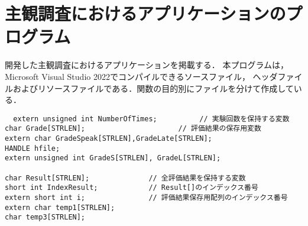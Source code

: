\chapter{主観調査におけるアプリケーションのプログラム}
開発した主観調査におけるアプリケーションを掲載する．
本プログラムは，Microsoft Visual Studio 2022でコンパイルできるソースファイル，
ヘッダファイルおよびリソースファイルである．関数の目的別にファイルを分けて作成している．

\begin{verbatim}
  extern unsigned int NumberOfTimes;          // 実験回数を保持する変数
char Grade[STRLEN];                      // 評価結果の保存用変数
extern char GradeSpeak[STRLEN],GradeLate[STRLEN];
HANDLE hfile;
extern unsigned int GradeS[STRLEN], GradeL[STRLEN];

char Result[STRLEN];              // 全評価結果を保持する変数
short int IndexResult;            // Result[]のインデックス番号 
extern short int i;               // 評価結果保存用配列のインデックス番号
extern char temp1[STRLEN];
char temp3[STRLEN];

\end{verbatim}